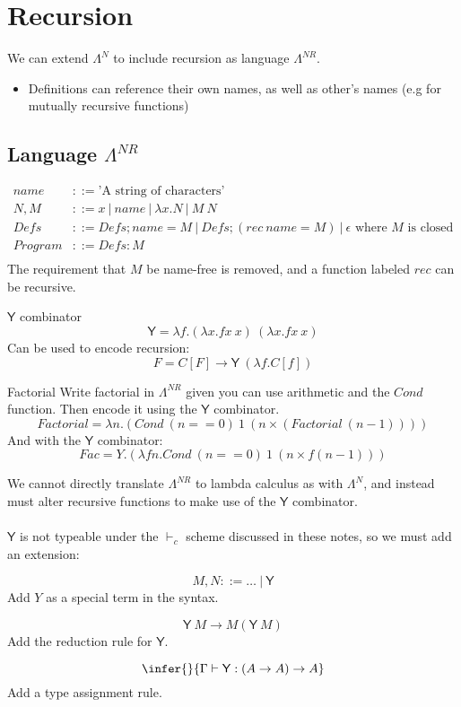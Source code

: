 \chapter{Recursion}
We can extend $\Lambda^N$ to include recursion as language $\Lambda^{NR}$.
\begin{itemize}
    \item Definitions can reference their own names, as well as other's names (e.g for mutually recursive functions)
\end{itemize}

\section{Language $\Lambda^{NR}$}
\[\begin{split}
    name & ::= \text{'A string of characters'} \\
    N, M & ::= x \ | \ name \ | \ \lambda x. N \ | \ M \ N \\
    Defs & ::= Defs ; name = M \ | \ Defs ; (rec \ name = M) \ | \ \epsilon \text{ where } M \text{ is closed}\\ 
    Program & ::= Defs : M \\
\end{split}\]
The requirement that $M$ be name-free is removed, and a function labeled $rec$ can be recursive.

\begin{definitionbox}{$\mathsf{Y}$ combinator}
    \[\mathsf{Y} = \lambda f . (\lambda x . f x \ x) \ (\lambda x . f x \ x)\]
    Can be used to encode recursion:
    \[F = C [F] \to \mathsf{Y} \ (\lambda f . C [f]) \]
\end{definitionbox}

\begin{examplebox}{Factorial}
    Write factorial in $\Lambda^{NR}$ given you can use arithmetic and the $Cond$ function. Then encode it using the $\mathsf{Y}$ combinator.
    \tcblower
    \[Factorial = \lambda n . (Cond \ (n == 0) \ 1 \ (n \times (Factorial \ (n - 1))) )\]
    And with the $\mathsf{Y}$ combinator:
    \[Fac = Y . (\lambda f n . Cond \ (n == 0) \ 1 \ (n \times f (n - 1)))\]
\end{examplebox}
We cannot directly translate $\Lambda^{NR}$ to lambda calculus as with $\Lambda^N$, and instead must alter recursive functions to make use of the $\mathsf{Y}$ combinator.
\\
\\ $\mathsf{Y}$ is not typeable under the $\vdash_c$ scheme discussed in these notes, so we must add an extension:
\\ \begin{minipage}[b]{.33\textwidth}
    \[M, N ::= \dots \ | \ \mathsf{Y}\]
    Add $Y$ as a special term in the syntax.
\end{minipage}
\begin{minipage}[b]{.33\textwidth}
    \[\mathsf{Y} \ M \to M (\mathsf{Y} \ M)\]
    Add the reduction rule for $\mathsf{Y}$.
\end{minipage}
\begin{minipage}[b]{.33\textwidth}
    \[\infer{}{\Gamma \vdash \mathsf{Y} : (A \to A) \to A}\]
    Add a type assignment rule.
\end{minipage}

